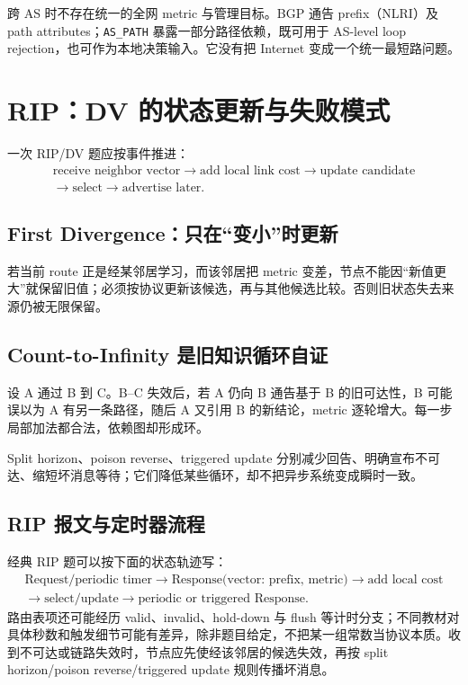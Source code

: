 \documentclass[11pt,a4paper]{ctexart}
\newcommand{\code}[1]{\texttt{#1}}
\begin{document}
跨 AS 时不存在统一的全网 metric 与管理目标。BGP 通告 prefix（NLRI）及 path attributes；\code{AS\_PATH} 暴露一部分路径依赖，既可用于 AS-level loop rejection，也可作为本地决策输入。它没有把 Internet 变成一个统一最短路问题。

\section{RIP：DV 的状态更新与失败模式}

一次 RIP/DV 题应按事件推进：
\[
\begin{gathered}
\text{receive neighbor vector}\to\text{add local link cost}\to\text{update candidate}\\
\to\text{select}\to\text{advertise later}.
\end{gathered}
\]

\subsection{First Divergence：只在“变小”时更新}

若当前 route 正是经某邻居学习，而该邻居把 metric 变差，节点不能因“新值更大”就保留旧值；必须按协议更新该候选，再与其他候选比较。否则旧状态失去来源仍被无限保留。

\subsection{Count-to-Infinity 是旧知识循环自证}

设 A 通过 B 到 C。B--C 失效后，若 A 仍向 B 通告基于 B 的旧可达性，B 可能误以为 A 有另一条路径，随后 A 又引用 B 的新结论，metric 逐轮增大。每一步局部加法都合法，依赖图却形成环。

Split horizon、poison reverse、triggered update 分别减少回告、明确宣布不可达、缩短坏消息等待；它们降低某些循环，却不把异步系统变成瞬时一致。

\subsection{RIP 报文与定时器流程}

经典 RIP 题可以按下面的状态轨迹写：
\[
\begin{gathered}
\text{Request/periodic timer}\to\text{Response(vector: prefix, metric)}\to\text{add local cost}\\
\to\text{select/update}\to\text{periodic or triggered Response}.
\end{gathered}
\]
路由表项还可能经历 valid、invalid、hold-down 与 flush 等计时分支；不同教材对具体秒数和触发细节可能有差异，除非题目给定，不把某一组常数当协议本质。收到不可达或链路失效时，节点应先使经该邻居的候选失效，再按 split horizon/poison reverse/triggered update 规则传播坏消息。
\end{document}

